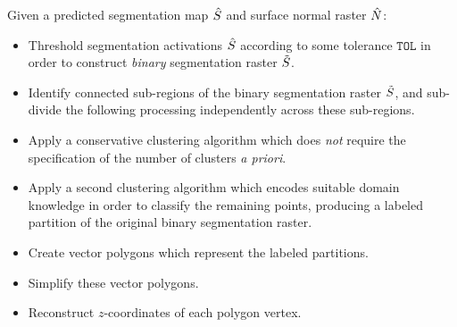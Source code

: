 \begin{leftbar}
  \noindent
  Given a predicted segmentation map $\hat{S}$ and surface normal raster $\hat{N}$:
  \begin{itemize}[leftmargin=*]
    \item Threshold segmentation activations $\hat{S}$ according to some tolerance $\texttt{TOL}$ in order to construct \emph{binary} segmentation raster $\tilde{S}$.
    \item Identify connected sub-regions of the binary segmentation raster $\tilde{S}$, and sub-divide the following processing independently across these sub-regions.
    \item Apply a conservative clustering algorithm which does \emph{not} require the specification of the number of clusters \textit{a priori}.
    \item Apply a second clustering algorithm which encodes suitable domain knowledge in order to classify the remaining points, producing a labeled partition of the original binary segmentation raster.
    \item Create vector polygons which represent the labeled partitions.
    \item Simplify these vector polygons.
    \item Reconstruct $z$-coordinates of each polygon vertex.
  \end{itemize}
\end{leftbar}
